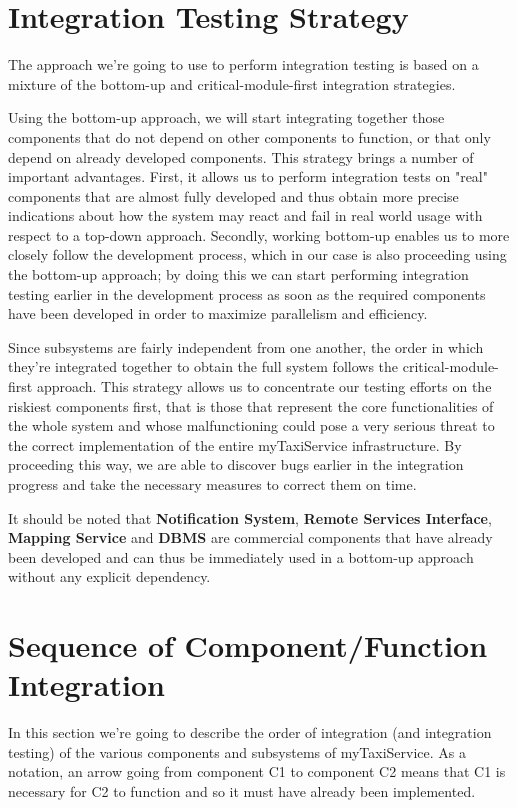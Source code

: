 \section{Integration Testing Strategy}
The approach we're going to use to perform integration testing is based on a mixture of the bottom-up and critical-module-first integration strategies.

Using the bottom-up approach, we will start integrating together those components that do not depend on other components to function, or that only depend on already developed components. This strategy brings a number of important advantages. First, it allows us to perform integration tests on "real" components that are almost fully developed and thus obtain more precise indications about how the system may react and fail in real world usage with respect to a top-down approach. Secondly, working bottom-up enables us to more closely follow the development process, which in our case is also proceeding using the bottom-up approach; by doing this we can start performing integration testing earlier in the development process as soon as the required components have been developed in order to maximize parallelism and efficiency.

Since subsystems are fairly independent from one another, the order in which they're integrated together to obtain the full system follows the critical-module-first approach. This strategy allows us to concentrate our testing efforts on the riskiest components first, that is those that represent the core functionalities of the whole system and whose malfunctioning could pose a very serious threat to the correct implementation of the entire myTaxiService infrastructure. By proceeding this way, we are able to discover bugs earlier in the integration progress and take the necessary measures to correct them on time.

It should be noted that \textbf{Notification System}, \textbf{Remote Services Interface}, \textbf{Mapping Service} and \textbf{DBMS} are commercial components that have already been developed and can thus be immediately used in a bottom-up approach without any explicit dependency. 
\section{Sequence of Component/Function Integration}
In this section we're going to describe the order of integration (and integration testing) of the various components and subsystems of myTaxiService. As a notation, an arrow going from component C1 to component C2 means that C1 is necessary for C2 to function and so it must have already been implemented. 
